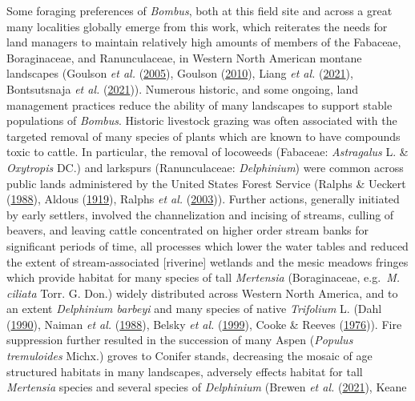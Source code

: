 \documentclass[
]{article}
\begin{document}
Some foraging preferences of \emph{Bombus}, both at this field site and
across a great many localities globally emerge from this work, which
reiterates the needs for land managers to maintain relatively high
amounts of members of the Fabaceae, Boraginaceae, and Ranunculaceae, in
Western North American montane landscapes (Goulson \emph{et al.}
(\protect\hyperlink{ref-goulson2005causes}{2005}), Goulson
(\protect\hyperlink{ref-goulson2010bumblebees}{2010}), Liang \emph{et
al.} (\protect\hyperlink{ref-liang2021evolutionary}{2021}), Bontsutsnaja
\emph{et al.} (\protect\hyperlink{ref-bontvsutvsnaja2021bumble}{2021})).
Numerous historic, and some ongoing, land management practices reduce
the ability of many landscapes to support stable populations of
\emph{Bombus}. Historic livestock grazing was often associated with the
targeted removal of many species of plants which are known to have
compounds toxic to cattle. In particular, the removal of locoweeds
(Fabaceae: \emph{Astragalus} L. \& \emph{Oxytropis} DC.) and larkspurs
(Ranunculaceae: \emph{Delphinium}) were common across public lands
administered by the United States Forest Service (Ralphs \& Ueckert
(\protect\hyperlink{ref-ralphs1988herbicide}{1988}), Aldous
(\protect\hyperlink{ref-aldous1919eradicating}{1919}), Ralphs \emph{et
al.} (\protect\hyperlink{ref-ralphs2003mechanism}{2003})). Further
actions, generally initiated by early settlers, involved the
channelization and incising of streams, culling of beavers, and leaving
cattle concentrated on higher order stream banks for significant periods
of time, all processes which lower the water tables and reduced the
extent of stream-associated {[}riverine{]} wetlands and the mesic
meadows fringes which provide habitat for many species of tall
\emph{Mertensia} (Boraginaceae, e.g.~\emph{M. ciliata} Torr. G. Don.)
widely distributed across Western North America, and to an extent
\emph{Delphinium barbeyi} and many species of native \emph{Trifolium} L.
(Dahl (\protect\hyperlink{ref-dahl1990wetlands}{1990}), Naiman \emph{et
al.} (\protect\hyperlink{ref-naiman1988alteration}{1988}), Belsky
\emph{et al.} (\protect\hyperlink{ref-belsky1999survey}{1999}), Cooke \&
Reeves (\protect\hyperlink{ref-cooke1976arroyos}{1976})). Fire
suppression further resulted in the succession of many Aspen
(\emph{Populus tremuloides} Michx.) groves to Conifer stands, decreasing
the mosaic of age structured habitats in many landscapes, adversely
effects habitat for tall \emph{Mertensia} species and several species of
\emph{Delphinium} (Brewen \emph{et al.}
(\protect\hyperlink{ref-brewen202176}{2021}), Keane
\end{document}
